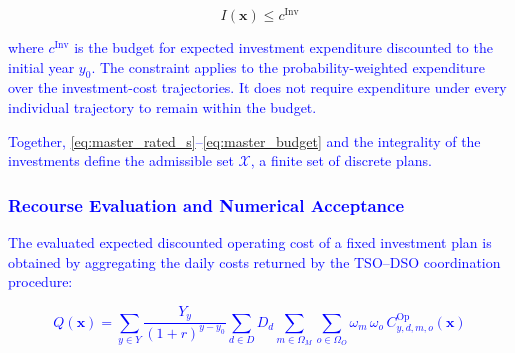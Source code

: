 \documentclass[preprint,12pt]{elsarticle}
\begin{document}
\begin{equation}
    I(\boldsymbol{x}) \leq c^{\text{Inv}}
    \label{eq:master_budget}
\end{equation}

\noindent
\textcolor{blue}{
    where 
    $c^{\text{Inv}}$ is the budget for expected investment expenditure discounted to the initial year $y_0$.
    The constraint applies to the probability-weighted expenditure over the investment-cost trajectories. It does not require expenditure under every individual trajectory to remain within the budget.
}

\textcolor{blue}{
    Together, \eqref{eq:master_rated_s}--\eqref{eq:master_budget} and the integrality of the investments define the admissible set $\mathcal{X}$, a finite set of discrete plans. 
}



\subsubsection{\textcolor{blue}{Recourse Evaluation and Numerical Acceptance}}
\label{subsubsec:certification}

\textcolor{blue}{
    The evaluated expected discounted operating cost of a fixed investment plan is obtained by aggregating the daily costs returned by the TSO--DSO coordination procedure:
}

\textcolor{blue}{
    \begin{equation}
        Q(\boldsymbol{x}) =
        \sum_{y \in Y} \frac{Y_y}{(1+r)^{y-y_0}}
        \sum_{d \in D} D_d
        \sum_{m \in \Omega_M} \sum_{o \in \Omega_O} \omega_m \, \omega_o \,
        C^{\text{Op}}_{y,d,m,o}(\boldsymbol{x})
        \label{eq:recourse_value}
    \end{equation}
}
\end{document}
